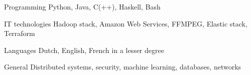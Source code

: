 


\begin{cvskills}


\cvskill
{Programming} %
{Python, Java, C(++), Haskell, Bash} %


\cvskill
{IT technologies} %
{Hadoop stack, Amazon Web Services, FFMPEG, Elastic stack, Terraform} %


\cvskill
{Languages} %
{Dutch, English, French in a lesser degree} %


\cvskill
{General} %
{Distributed systems, security, machine learning, databases, networks} %

\end{cvskills}